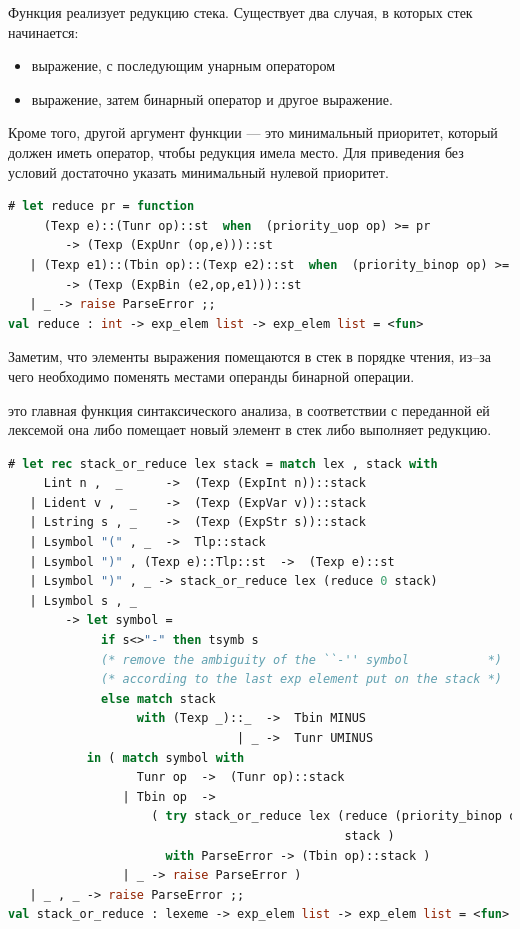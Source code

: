 Функция  реализует редукцию стека. Существует два случая, в 
которых стек начинается:

\begin{itemize}
	\item выражение, с последующим унарным оператором

	\item выражение, затем бинарный оператор и другое выражение. 
\end{itemize}

Кроме того, другой аргумент функции  --- это минимальный 
приоритет, который должен иметь оператор, чтобы редукция имела место. Для 
приведения без условий достаточно указать минимальный нулевой приоритет.

\begin{lstlisting}[language=OCaml]
# let reduce pr = function 
     (Texp e)::(Tunr op)::st  when  (priority_uop op) >= pr
        -> (Texp (ExpUnr (op,e)))::st
   | (Texp e1)::(Tbin op)::(Texp e2)::st  when  (priority_binop op) >= pr
        -> (Texp (ExpBin (e2,op,e1)))::st 
   | _ -> raise ParseError ;;
val reduce : int -> exp_elem list -> exp_elem list = <fun>
\end{lstlisting}

Заметим, что элементы выражения помещаются в стек в порядке чтения, из--за чего 
необходимо поменять местами операнды бинарной операции.

 это главная функция синтаксического анализа, в 
соответствии с переданной ей лексемой она либо помещает новый элемент в стек 
либо выполняет редукцию.

\begin{lstlisting}[language=OCaml]
# let rec stack_or_reduce lex stack = match lex , stack with 
     Lint n ,  _      ->  (Texp (ExpInt n))::stack 
   | Lident v ,  _    ->  (Texp (ExpVar v))::stack 
   | Lstring s , _    ->  (Texp (ExpStr s))::stack
   | Lsymbol "(" , _  ->  Tlp::stack
   | Lsymbol ")" , (Texp e)::Tlp::st  ->  (Texp e)::st
   | Lsymbol ")" , _ -> stack_or_reduce lex (reduce 0 stack) 
   | Lsymbol s , _ 
        -> let symbol = 
             if s<>"-" then tsymb s 
             (* remove the ambiguity of the ``-'' symbol           *)
             (* according to the last exp element put on the stack *)
             else match stack 
                  with (Texp _)::_  ->  Tbin MINUS 
                                | _ ->  Tunr UMINUS 
           in ( match symbol with 
                  Tunr op  ->  (Tunr op)::stack 
                | Tbin op  -> 
                    ( try stack_or_reduce lex (reduce (priority_binop op) 
                                               stack )
                      with ParseError -> (Tbin op)::stack )
                | _ -> raise ParseError )
   | _ , _ -> raise ParseError ;;
val stack_or_reduce : lexeme -> exp_elem list -> exp_elem list = <fun>
\end{lstlisting}

